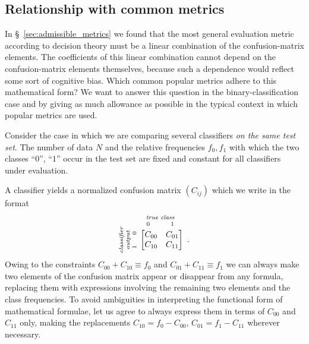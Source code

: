 \documentclass[\ifafour a4paper,12pt,\else a5paper,10pt,\fi%
onecolumn,oneside,article,%
british%
]{memoir}
\theoremstyle{remark}
\theoremstyle{innote}
\renewcommand*{\|}[1][]{\nonscript\:#1\vert\nonscript\:\mathopen{}}
\newcommand*{\sect}{\S}%
\begin{document}
\subsection{Relationship with common metrics}
\label{sec:common_metrics}

In \sect~\ref{sec:admissible_metrics} we found that the most general evaluation metric according to decision theory must be a linear combination of the confusion-matrix elements. The coefficients of this linear combination cannot depend on the confusion-matrix elements themselves, because such a dependence would reflect some sort of cognitive bias. Which common popular metrics adhere to this mathematical form? We want to answer this question in the binary-classification case and by giving as much allowance as possible in the typical context in which popular metrics are used.

Consider the case in which we are comparing several classifiers \emph{on the same test set}. The number of data $N$ and the relative frequencies $f_{0}, f_{1}$ with which the two classes \enquote{$0$}, \enquote{$1$} occur in the test set are fixed and constant for all classifiers under evaluation.

A classifier yields a normalized confusion matrix $(C_{ij})$ which we write in the format
\begin{equation*}
  \rotatebox[origin=c]{90}{
    \clap{\textit{\parbox{5em}{\centering\scriptsize classifier\\output\\$1\hspace{1.5em}0$}}
    }}\ 
    \overbracket[0pt]{
      \begin{bmatrix} C_{00} & C_{01} \\ C_{10} & C_{11}
      \end{bmatrix}}^{
      \clap{\textit{\parbox{6em}{\centering\scriptsize true class\\$0\hspace{3em}1$}}
    }} \ .
\end{equation*}

Owing to the constraints $C_{00} + C_{10} \equiv f_{0}$ and $C_{01} + C_{11} \equiv f_{1}$ we can always make two elements of the confusion matrix appear or disappear from any formula, replacing them with expressions involving the remaining two elements and the class frequencies. To avoid ambiguities in interpreting the functional form of mathematical formulae, let us agree to always express them in terms of $C_{00}$ and $C_{11}$ only, making the replacements $C_{10} = f_{0} - C_{00}$, $C_{01} = f_{1} - C_{11}$ wherever necessary.
\end{document}

